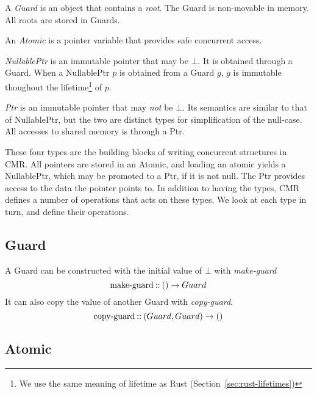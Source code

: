 \begin{definition}[Guard]
  A \emph{Guard} is an object that contains a \emph{root}. The Guard is non-movable in memory.
  All roots are stored in Guards.
\end{definition}

\begin{definition}[Atomic]
  An \emph{Atomic} is a pointer variable that provides safe concurrent access.
\end{definition}

\begin{definition}[NullablePtr]
  \emph{NullablePtr} is an immutable pointer that may be $\bot$. It is obtained through a Guard.
  When a NullablePtr $p$ is obtained from a Guard $g$, $g$ is immutable thoughout the
  lifetime\footnote{We use the same meaning of lifetime as Rust (Section~\ref{sec:rust-lifetimes})}
  of $p$.
\end{definition}

\begin{definition}[Ptr]
  \emph{Ptr} is an immutable pointer that may \emph{not} be $\bot$. Its semantics are similar to
  that of NullablePtr, but the two are distinct types for simplification of the null-case. All
  accesses to shared memory is through a Ptr.
\end{definition}

These four types are the building blocks of writing concurrent structures in CMR\@. All pointers
are stored in an Atomic, and loading an atomic yields a NullablePtr, which may be promoted to a
Ptr, if it is not null. The Ptr provides access to the data the pointer points to.
In addition to having the types, CMR defines a number of operations that acts on these types.
We look at each type in turn, and define their operations.

\subsection{Guard}
A Guard can be constructed with the initial value of $\bot$ with \emph{make-guard}
\begin{equation}\label{eq:make-guard}
  \text{make-guard\:::\:} () \to Guard
\end{equation}
It can also copy the value of another Guard with \emph{copy-guard}.
\begin{equation}\label{eq:copy-guard}
  \text{copy-guard\:::\:} (Guard, Guard) \to ()
\end{equation}


\subsection{Atomic}

